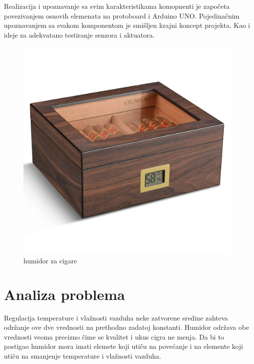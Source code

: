 \documentclass[a4paper, 12pt]{article}
\begin{document}
\vspace{10pt}


Realizacija i upoznavanje sa svim karakteristikama komopnenti je započeta povezivanjem osnovih elemenata na protoboard i Arduino UNO. Pojedinačnim upoznavanjem sa svakom komponentom je smišljen krajni koncept projekta. Kao i ideje za adekvatano testiranje senzora i aktuatora. 

\vspace{10pt}


\begin{figure}[H]
\centering
\includegraphics[scale=0.13]{images/primer}
\caption{humidor za cigare} \label{fig:primer}
\end{figure}

\pagebreak
\endgroup

\begingroup
\justifying

\section{Analiza problema}

Regulacija temperature i vlažnosti vazduha neke zatvorene sredine zahteva održanje ove dve vrednosti na prethodno zadatoj konstanti. Humidor održava obe vrednosti veoma precizno čime se kvalitet i ukus cigra ne menja. Da bi to postigao humidor mora imati elemete koji utiču na povećanje i na elemente koji utiču na smanjenje temperature i vlažnosti vazduha. 
\end{document}
